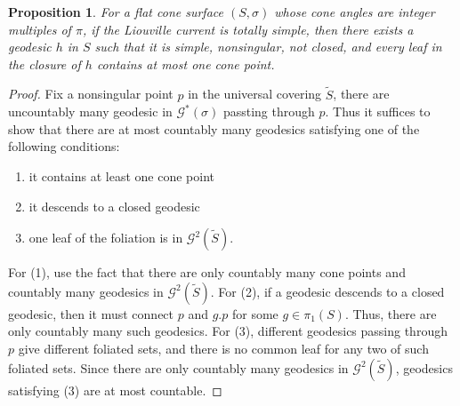 \documentclass[reqno]{amsart}
\theoremstyle{plain}
\newtheorem{lemma}[thm]{Lemma}
\newtheorem{prop}[thm]{Proposition}
\theoremstyle{definition}
\theoremstyle{remark}
\theoremstyle{definition}
\newcommand{\?}{\textcolor{red}{?}}
\newcommand{\Gssigma}{\mathcal{G}^*(\sigma) }
\newcommand{\Gts}{\mathcal{G}^2(\tilde{S}) }
\begin{document}

\begin{prop}\label{nonsingular}
For a flat cone surface $(S,\sigma)$ whose cone angles are integer multiples of $\pi$, if the Liouville current is totally simple, then there exists a geodesic $h$ in $S$ such that it is simple, nonsingular, not closed, and every leaf in the closure of $h$ contains at most one cone point.
\end{prop}
\begin{proof}
Fix a nonsingular point $p$ in the universal covering $\tilde{S}$, there are uncountably many geodesic in $\Gssigma$ passting through $p$. Thus it suffices to show that there are at most countably many geodesics satisfying one of the following conditions:
\begin{enumerate}
    \item[(1)] it contains at least one cone point
    \item[(2)] it descends to a closed geodesic
    \item[(3)] one leaf of the foliation is in $\Gts$.
\end{enumerate}

For (1), use the fact that there are only countably many cone points and countably many geodesics in $\Gts$. For (2), if a geodesic descends to a closed geodesic, then it must connect $p$ and $g.p$ for some $g\in\pi_1(S)$. Thus, there are only countably many such geodesics. For (3), different geodesics passing through $p$ give different foliated sets, and there is no common leaf for any two of such foliated sets. Since there are only countably many geodesics in $\Gts$, geodesics satisfying (3) are at most countable.
\end{proof}
\end{document}

